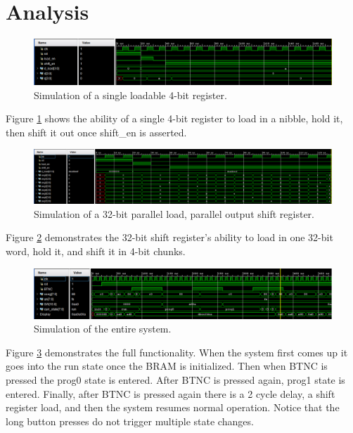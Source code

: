 \documentclass[11pt]{article}
\begin{document}
\section{Analysis}

\begin{figure}[H]
\includegraphics[width=7 in]{./figures/custom_ff.eps}
	\centering
	\caption{Simulation of a single loadable 4-bit register.}
	\label{fig:custom_ff}
\end{figure}

Figure \ref{fig:custom_ff} shows the ability of a single 4-bit register to load in a nibble, hold it, then shift it out once shift\_en is asserted.

\begin{figure}[H]
\includegraphics[width=7 in]{./figures/shift_reg.eps}
	\centering
	\caption{Simulation of a 32-bit parallel load, parallel output shift register.}
	\label{fig:shift_reg}
\end{figure}

Figure \ref{fig:shift_reg} demonstrates the 32-bit shift register's ability to load in one 32-bit word, hold it, and shift it in 4-bit chunks.

\begin{figure}[H]
\includegraphics[width=7 in]{./figures/top_tb_prog.eps}
	\centering
	\caption{Simulation of the entire system.}
	\label{fig:top_tb}
\end{figure}

Figure \ref{fig:top_tb} demonstrates the full functionality. When the system first comes up it goes into the run state once the BRAM is initialized. Then when BTNC is pressed the prog0 state is entered. After BTNC is pressed again, prog1 state is entered. Finally, after BTNC is pressed again there is a 2 cycle delay, a shift register load, and then the system resumes normal operation. Notice that the long button presses do not trigger multiple state changes.
\end{document}

